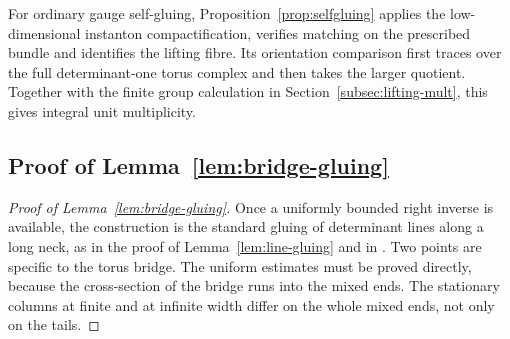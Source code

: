 \documentclass[11pt]{amsart}
\theoremstyle{definition}
\theoremstyle{remark}
\theoremstyle{plain}
\numberwithin{equation}{section}
\begin{document}
For ordinary gauge self-gluing,
Proposition~\ref{prop:selfgluing} applies the low-dimensional
instanton compactification, verifies matching on the prescribed
bundle and identifies the lifting fibre. Its orientation comparison
first traces over the full determinant-one torus complex and then
takes the larger quotient. Together with the finite group calculation
in Section~\ref{subsec:lifting-mult}, this gives integral unit multiplicity.

\subsection{Proof of Lemma~\ref{lem:bridge-gluing}}\label{app:bridge-gluing}
\begin{proof}[Proof of Lemma~\ref{lem:bridge-gluing}]
Once a uniformly bounded right inverse is available, the construction is
the standard gluing of determinant lines along a long neck, as in the proof
of Lemma~\ref{lem:line-gluing} and in \cite[proof of Proposition~3.9 and
Proposition~5.11]{Donaldson-book}. Two points are specific to the torus
bridge. The uniform estimates must be proved directly, because the
cross-section of the bridge runs into the mixed ends. The stationary
columns at finite and at infinite width differ on the whole mixed ends,
not only on the tails.


\end{proof}
\end{document}
